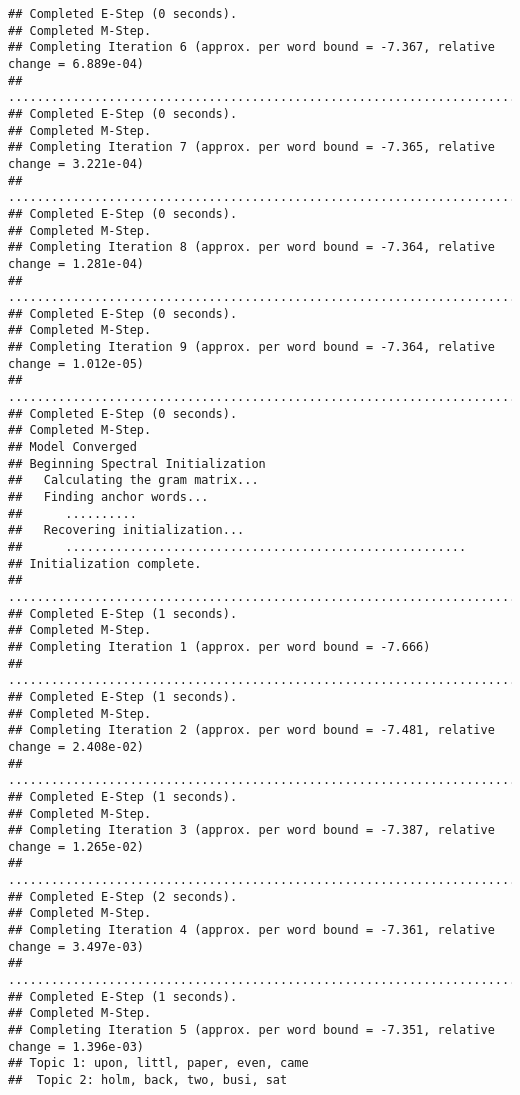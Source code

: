 \documentclass[
]{book}
\begin{document}
\begin{verbatim}
## Completed E-Step (0 seconds). 
## Completed M-Step. 
## Completing Iteration 6 (approx. per word bound = -7.367, relative change = 6.889e-04) 
## ....................................................................................................
## Completed E-Step (0 seconds). 
## Completed M-Step. 
## Completing Iteration 7 (approx. per word bound = -7.365, relative change = 3.221e-04) 
## ....................................................................................................
## Completed E-Step (0 seconds). 
## Completed M-Step. 
## Completing Iteration 8 (approx. per word bound = -7.364, relative change = 1.281e-04) 
## ....................................................................................................
## Completed E-Step (0 seconds). 
## Completed M-Step. 
## Completing Iteration 9 (approx. per word bound = -7.364, relative change = 1.012e-05) 
## ....................................................................................................
## Completed E-Step (0 seconds). 
## Completed M-Step. 
## Model Converged 
## Beginning Spectral Initialization 
##   Calculating the gram matrix...
##   Finding anchor words...
##      ..........
##   Recovering initialization...
##      ........................................................
## Initialization complete.
## ....................................................................................................
## Completed E-Step (1 seconds). 
## Completed M-Step. 
## Completing Iteration 1 (approx. per word bound = -7.666) 
## ....................................................................................................
## Completed E-Step (1 seconds). 
## Completed M-Step. 
## Completing Iteration 2 (approx. per word bound = -7.481, relative change = 2.408e-02) 
## ....................................................................................................
## Completed E-Step (1 seconds). 
## Completed M-Step. 
## Completing Iteration 3 (approx. per word bound = -7.387, relative change = 1.265e-02) 
## ....................................................................................................
## Completed E-Step (2 seconds). 
## Completed M-Step. 
## Completing Iteration 4 (approx. per word bound = -7.361, relative change = 3.497e-03) 
## ....................................................................................................
## Completed E-Step (1 seconds). 
## Completed M-Step. 
## Completing Iteration 5 (approx. per word bound = -7.351, relative change = 1.396e-03) 
## Topic 1: upon, littl, paper, even, came 
##  Topic 2: holm, back, two, busi, sat 

\end{verbatim}
\end{document}
